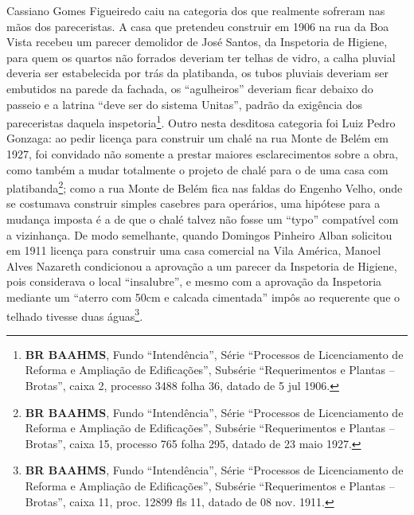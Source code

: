 Cassiano Gomes Figueiredo caiu na categoria dos que realmente sofreram nas mãos dos pareceristas. A casa que pretendeu construir em 1906 na rua da Boa Vista recebeu um parecer demolidor de José Santos, da Inspetoria de Higiene, para quem os quartos não forrados deveriam ter telhas de vidro, a calha pluvial deveria ser estabelecida por trás da platibanda, os tubos pluviais deveriam ser embutidos na parede da fachada, os ``agulheiros'' deveriam ficar debaixo do passeio e a latrina ``deve ser do sistema Unitas'', padrão da exigência dos pareceristas daquela inspetoria\footnote{\textbf{BR BAAHMS}, Fundo ``Intendência'', Série ``Processos de Licenciamento de Reforma e Ampliação de Edificações'', Subsérie ``Requerimentos e Plantas – Brotas'', caixa 2, processo 3488 folha 36, datado de 5 jul 1906.}. Outro nesta desditosa categoria foi Luiz Pedro Gonzaga: ao pedir licença para construir um chalé na rua Monte de Belém em 1927, foi convidado não somente a prestar maiores esclarecimentos sobre a obra, como também a mudar totalmente o projeto de chalé para o de uma casa com platibanda\footnote{\textbf{BR BAAHMS}, Fundo ``Intendência'', Série ``Processos de Licenciamento de Reforma e Ampliação de Edificações'', Subsérie ``Requerimentos e Plantas – Brotas'', caixa 15, processo 765 folha 295, datado de 23 maio 1927.}; como a rua Monte de Belém fica nas faldas do Engenho Velho, onde se costumava construir simples casebres para operários, uma hipótese para a mudança imposta é a de que o chalé talvez não fosse um ``typo'' compatível com a vizinhança. De modo semelhante, quando Domingos Pinheiro Alban solicitou em 1911 licença para construir uma casa comercial na Vila América, Manoel Alves Nazareth condicionou a aprovação a um parecer da Inspetoria de Higiene, pois considerava o local ``insalubre'', e mesmo com a aprovação da Inspetoria mediante um ``aterro com 50cm e calcada cimentada'' impôs ao requerente que o telhado tivesse duas águas\footnote{\textbf{BR BAAHMS}, Fundo ``Intendência'', Série ``Processos de Licenciamento de Reforma e Ampliação de Edificações'', Subsérie ``Requerimentos e Plantas – Brotas'', caixa 11, proc. 12899 fls 11, datado de 08 nov. 1911.}. 

